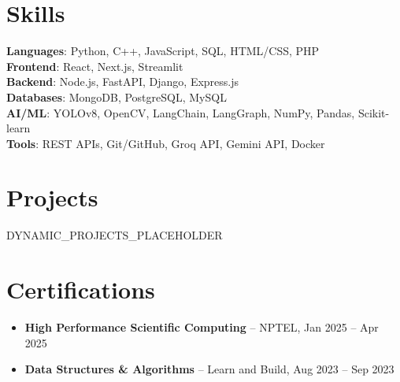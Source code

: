 \documentclass[letterpaper,11pt]{article}
\newcommand{\resumeItem}[1]{
  \item\small{
    {#1 \vspace{-2pt}} %
  }
}
\newcommand{\resumeSubHeadingListStart}{\begin{itemize}[leftmargin=0in, label={}]}
\newcommand{\resumeSubHeadingListEnd}{\end{itemize}\vspace{-2pt}}
\newcommand{\resumeItemListStart}{\begin{itemize}}
\newcommand{\resumeItemListEnd}{\end{itemize}\vspace{-4pt}}
\begin{document}
\section{Skills}
 \begin{itemize}[leftmargin=0.15in, label={}]
    \small{\item{
     \textbf{Languages}{: Python, C++, JavaScript, SQL, HTML/CSS, PHP} \\
     \textbf{Frontend}{: React, Next.js, Streamlit} \\
     \textbf{Backend}{: Node.js, FastAPI, Django, Express.js} \\
     \textbf{Databases}{: MongoDB, PostgreSQL, MySQL} \\
     \textbf{AI/ML}{: YOLOv8, OpenCV, LangChain, LangGraph, NumPy, Pandas, Scikit-learn} \\
     \textbf{Tools}{: REST APIs, Git/GitHub, Groq API, Gemini API, Docker}
    }}
 \end{itemize}
 \vspace{-12pt}

\section{Projects}
  \resumeSubHeadingListStart
{{DYNAMIC_PROJECTS_PLACEHOLDER}}
  \resumeSubHeadingListEnd
 
\section{Certifications}
\resumeItemListStart
    \resumeItem{\textbf{High Performance Scientific Computing} -- NPTEL, Jan 2025 -- Apr 2025}
    \resumeItem{\textbf{Data Structures \& Algorithms} -- Learn and Build, Aug 2023 -- Sep 2023}
\resumeItemListEnd
\end{document}
